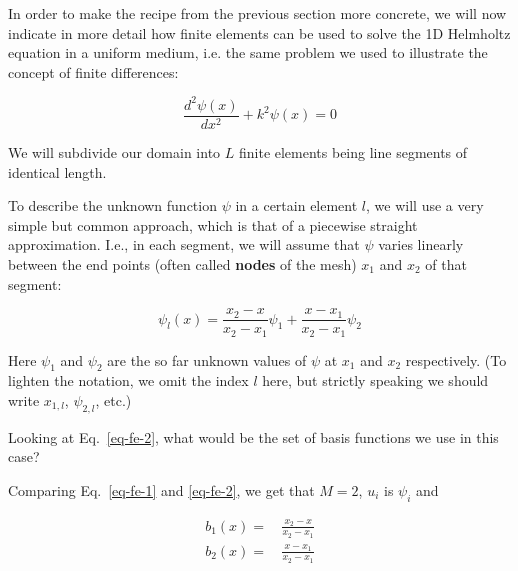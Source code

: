 

In order to make the recipe from the previous section more concrete, we will now indicate in more detail how finite elements can be used to solve the 1D Helmholtz equation in a uniform medium, i.e. the same problem we used to illustrate the concept of finite differences:

\begin{equation}
\frac{d^2 \psi (x)}{d x^2} + k^2 \psi(x) = 0 \label{eq-helmholtz-1d-2}
\end{equation} 

We will subdivide our domain into $L$ finite elements being line segments of identical length.


To describe the unknown function $\psi$ in a certain element $l$, we will use a very simple but common approach, which is that of a piecewise straight approximation.  I.e., in each segment, we will assume that $\psi$ varies linearly between the end points (often called \textbf{nodes} of the mesh) $x_1$ and $x_2$ of that segment:

\noindent{}

\begin{equation}
\psi_l(x) = \frac{x_2 - x}{x_2 - x_1} \psi_1 + \frac{x - x_1}{x_2 - x_1} \psi_2 \label{eq-fe-2}
\end{equation} 

Here $\psi_1$ and $\psi_2$ are the so far unknown values of $\psi$ at $x_1$ and $x_2$ respectively. (To lighten the notation, we omit the index $l$ here, but strictly speaking we should write $x_{1,l}$, $\psi_{2,l}$, etc.)

\begin{cue}
Looking at Eq.~\ref{eq-fe-2}, what would be the set of basis functions we use in this case?
\end{cue}

Comparing Eq.~\ref{eq-fe-1} and \ref{eq-fe-2}, we get that $M=2$, $u_i$ is $\psi_i$ and

\begin{align}
b_1(x) =& \, \frac{x_2 - x}{x_2 - x_1} \\
b_2(x) =& \, \frac{x - x_1}{x_2 - x_1}
\end{align} 

